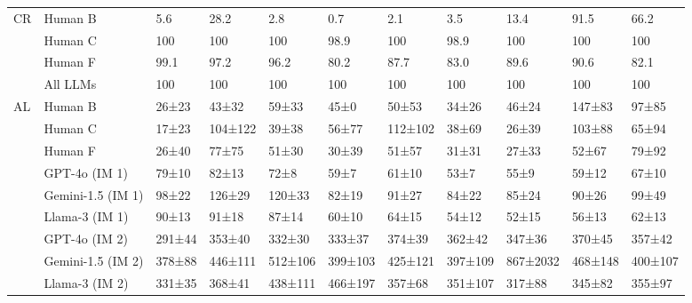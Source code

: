 \begin{table*}[]
\begin{tabular}{lllllllllll}
  CR &               Human  B &            5.6 &           28.2 &             2.8 &            0.7 &            2.1 &            3.5 &            13.4 &           91.5 &           66.2 \\
   &                 Human C &          100 &          100 &           100 &           98.9 &          100 &           98.9 &           100 &          100 &          100 \\
   &                Human F &           99.1 &           97.2 &            96.2 &           80.2 &           87.7 &           83.0 &            89.6 &           90.6 &           82.1 \\ 
   &                 All LLMs &           100 &           100 &            100 &           100 &           100 &           100 &            100 &           100 &           100 \\ \midrule \midrule

    AL &                Human B &   26{\tiny±23} &   43{\tiny±32} &    59{\tiny±33} &    45{\tiny±0} &   50{\tiny±53} &   34{\tiny±26} &    46{\tiny±24} &  147{\tiny±83} &   97{\tiny±85} \\
   &                Human C &   17{\tiny±23} & 104{\tiny±122} &    39{\tiny±38} &   56{\tiny±77} & 112{\tiny±102} &   38{\tiny±69} &    26{\tiny±39} &  103{\tiny±88} &   65{\tiny±94} \\
   &                Human F &   26{\tiny±40} &   77{\tiny±75} &    51{\tiny±30} &   30{\tiny±39} &   51{\tiny±57} &   31{\tiny±31} &    27{\tiny±33} &   52{\tiny±67} &   79{\tiny±92} \\ [0.15cm]

  &     GPT-4o (IM 1) &   79{\tiny±10} &   82{\tiny±13} &     72{\tiny±8} &    59{\tiny±7} &   61{\tiny±10} &    53{\tiny±7} &     55{\tiny±9} &   59{\tiny±12} &   67{\tiny±10} \\
   & Gemini-1.5 (IM 1) &   98{\tiny±22} &  126{\tiny±29} &   120{\tiny±33} &   82{\tiny±19} &   91{\tiny±27} &   84{\tiny±22} &    85{\tiny±24} &   90{\tiny±26} &   99{\tiny±49} \\
   &    Llama-3 (IM 1) &   90{\tiny±13} &   91{\tiny±18} &    87{\tiny±14} &   60{\tiny±10} &   64{\tiny±15} &   54{\tiny±12} &    52{\tiny±15} &   56{\tiny±13} &   62{\tiny±13} \\ [0.15cm]
   

   &     GPT-4o (IM 2) &  291{\tiny±44} &  353{\tiny±40} &   332{\tiny±30} &  333{\tiny±37} &  374{\tiny±39} &  362{\tiny±42} &   347{\tiny±36} &  370{\tiny±45} &  357{\tiny±42} \\
   & Gemini-1.5 (IM 2) &  378{\tiny±88} & 446{\tiny±111} &  512{\tiny±106} & 399{\tiny±103} & 425{\tiny±121} & 397{\tiny±109} & 867{\tiny±2032} & 468{\tiny±148} & 400{\tiny±107} \\
   &    Llama-3 (IM 2) &  331{\tiny±35} &  368{\tiny±41} &  438{\tiny±111} & 466{\tiny±197} &  357{\tiny±68} & 351{\tiny±107} &   317{\tiny±88} &  345{\tiny±82} &  355{\tiny±97} \\ [0.15cm]
   


\end{tabular}
\end{table*}
